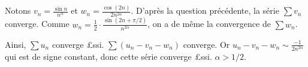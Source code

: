 \documentclass{yann}
\begin{document}
\begin{enumerate}
\begin{enumerate}
    Notons $v_n = \frac{\sin n}{n^α}$ et $w_n = \frac{\cos(2n)}{2n^{2α}}$.
    D'après la question précédente, la série $∑ v_n$ converge.
    Comme $w_n = \frac12 ⋅ \frac{\sin(2n+π/2)}{n^{2α}}$, on a de même la convergence de $∑ w_n$.

    Ainsi, $∑ u_n$ converge £ssi. $∑ (u_n - v_n - w_n)$ converge.
    Or $u_n - v_n - w_n \sim \frac{-1}{2n^{2α}}$ qui est de signe constant,
    donc cette série converge £ssi. $α > 1/2$.
  \end{enumerate}
\end{enumerate}
\end{document}
